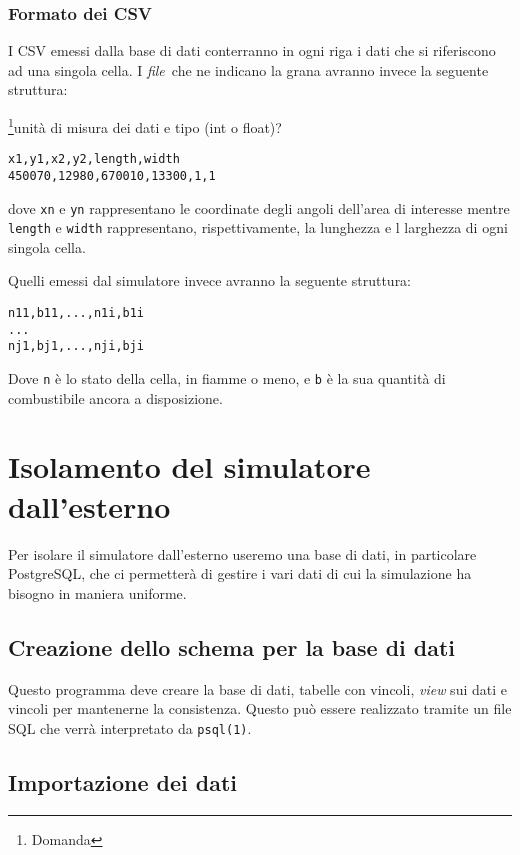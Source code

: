 \documentclass[draft]{article}
\newcommand{\psql}{\texttt{psql(1)}}
\newcommand{\file}{\textit{file}}
\begin{document}
\subsubsection{Formato dei CSV}

I CSV emessi dalla base di dati conterranno in ogni riga i dati che si
riferiscono ad una singola cella. I \file\ che ne indicano la grana avranno
invece la seguente struttura:

\footnote{Domanda}{unità di misura dei dati e tipo (int o float)?}
\begin{verbatim}
x1,y1,x2,y2,length,width
450070,12980,670010,13300,1,1
\end{verbatim}

dove \texttt{xn} e \texttt{yn} rappresentano le coordinate degli angoli
dell'area di interesse mentre \texttt{length} e \texttt{width} rappresentano,
rispettivamente, la lunghezza e l larghezza di ogni singola cella.

Quelli emessi dal simulatore invece avranno la seguente struttura:

\begin{verbatim}
n11,b11,...,n1i,b1i
...
nj1,bj1,...,nji,bji
\end{verbatim}

Dove \texttt{n} è lo stato della cella, in fiamme o meno, e \texttt{b} è la sua
quantità di combustibile ancora a disposizione.

\section{Isolamento del simulatore dall'esterno}

Per isolare il simulatore dall'esterno useremo una base di dati, in particolare
PostgreSQL, che ci permetterà di gestire i vari dati di cui la simulazione ha
bisogno in maniera uniforme.

\subsection{Creazione dello schema per la base di dati}

Questo programma deve creare la base di dati, tabelle con vincoli, \textit{view}
sui dati e vincoli per mantenerne la consistenza. Questo può essere realizzato
tramite un file SQL che verrà interpretato da \psql.

\subsection{Importazione dei dati}
\label{sec:import}
\end{document}
